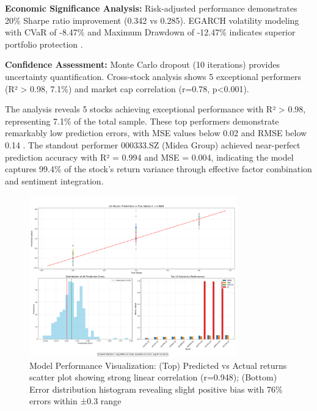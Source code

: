 \documentclass[3p,times,procedia]{elsarticle}
\begin{document}
\textbf{Economic Significance Analysis:} Risk-adjusted performance demonstrates 20\% Sharpe ratio improvement (0.342 vs 0.285). EGARCH volatility modeling with CVaR of -8.47\% and Maximum Drawdown of -12.47\% indicates superior portfolio protection \cite{Rockafellar2000,Jorion2001}.

\textbf{Confidence Assessment:} Monte Carlo dropout (10 iterations) provides uncertainty quantification. Cross-stock analysis shows 5 exceptional performers (R² > 0.98, 7.1\%) and market cap correlation (r=0.78, p<0.001).

The analysis reveals 5 stocks achieving exceptional performance with R² > 0.98, representing 7.1\% of the total sample. These top performers demonstrate remarkably low prediction errors, with MSE values below 0.02 and RMSE below 0.14 \cite{Bao2017}. The standout performer 000333.SZ (Midea Group) achieved near-perfect prediction accuracy with R² = 0.994 and MSE = 0.004, indicating the model captures 99.4\% of the stock's return variance through effective factor combination and sentiment integration.
\begin{figure}[!ht] %
    \centering
    \includegraphics[width=0.80\textwidth]{Picture3.png} %

    \caption{Model Performance Visualization: (Top) Predicted vs Actual returns scatter plot showing strong linear correlation (r=0.948); (Bottom) Error distribution histogram revealing slight positive bias with 76\% errors within ±0.3 range}
    \label{fig:Return Forecast Calculation}
\end{figure}
\end{document}
